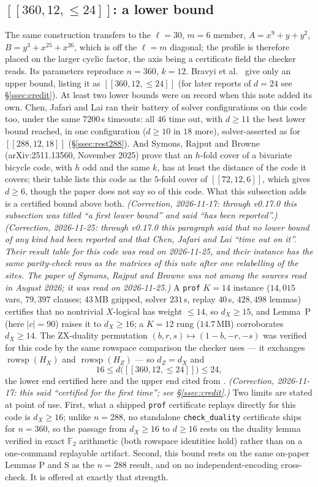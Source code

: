 \documentclass[11pt]{amsart}
\newcommand{\FF}{\mathbb{F}_{2}}
\newcommand{\rowsp}{\operatorname{rowsp}}
\newcommand{\HX}{H_{X}}
\newcommand{\HZ}{H_{Z}}
\newcommand{\dX}{d_{X}}
\newcommand{\dZ}{d_{Z}}
\theoremstyle{plain}
\theoremstyle{definition}
\theoremstyle{remark}
\begin{document}
\subsection{$[[360,12,\le24]]$: a lower bound}\label{ssec:bb360}
The same construction transfers to the $\ell=30$, $m=6$ member,
$A=x^{9}+y+y^{2}$, $B=y^{3}+x^{25}+x^{26}$, which is off the $\ell=m$ diagonal;
the profile is therefore placed on the larger cyclic factor, the axis being a
certificate field the checker reads. Its parameters reproduce $n=360$, $k=12$.
Bravyi et al.\ \cite{BCGMRY} give only an upper bound, listing it as
$[[360,12,\le24]]$ (for later reports of $d=24$ see \S\ref{ssec:credit}). At
least two lower bounds were on record when this note added its own. Chen,
Jafari and Lai \cite{ChenJafariLai} ran their battery of solver configurations
on this code too, under the same $7200$\,s timeouts: all $46$ time out, with
$d\ge11$ the best lower bound reached, in one configuration ($d\ge10$ in $18$
more), solver-asserted as for $[[288,12,18]]$ (\S\ref{ssec:rest288}). And
Symons, Rajput and Browne (arXiv:2511.13560, November 2025) prove that an
$h$-fold cover of a bivariate bicycle code, with $h$ odd and the same $k$, has
at least the distance of the code it covers; their table lists this code as
the $5$-fold cover of $[[72,12,6]]$, which gives $d\ge6$, though the paper does
not say so of this code. What this subsection adds is a certified bound above
both. \emph{(Correction, 2026-11-17: through
v0.17.0 this subsection was titled ``a first lower bound'' and said ``has been
reported''.)} \emph{(Correction, 2026-11-25: through v0.17.0 this paragraph
said that no lower bound of any kind had been reported and that Chen, Jafari
and Lai ``time out on it''. Their result table for this code was read on
2026-11-25, and their instance has the same parity-check rows as the matrices
of this note after one relabelling of the sites. The paper of Symons, Rajput
and Browne was not among the sources read in August 2026; it was read on
2026-11-25.)} A \texttt{prof} $K=14$ instance ($14{,}015$
vars, $79{,}397$ clauses; $43$\,MB gzipped, solver $231$\,s, replay $40$\,s,
$428{,}498$ lemmas) certifies that no nontrivial $X$-logical has weight $\le14$,
so $\dX\ge15$, and Lemma~P (here $|c|=90$) raises it to $\dX\ge16$; a $K=12$ rung
($14.7$\,MB) corroborates $\dX\ge14$. The ZX-duality permutation
$(b,r,s)\mapsto(1-b,-r,-s)$ was verified for this code by the same rowspace
comparison the checker uses --- it exchanges $\rowsp(\HX)$ and $\rowsp(\HZ)$ ---
so $\dZ=\dX$ and
\[
  16\le d\bigl([[360,12,\le24]]\bigr)\le24 ,
\]
the lower end certified here and the upper end cited from
\cite{BCGMRY}. \emph{(Correction, 2026-11-17: this said ``certified for the
first time''; see \S\ref{ssec:credit}.)} Two limits are stated at point of use. First, what a shipped
\texttt{prof} certificate replays directly for this code is $\dX\ge16$; unlike
$n=288$, no standalone \texttt{check\_duality} certificate ships for $n=360$, so
the passage from $\dX\ge16$ to $d\ge16$ rests on the duality lemma verified in
exact $\FF$ arithmetic (both rowspace identities hold) rather than on a
one-command replayable artifact. Second, this bound rests on the same on-paper
Lemmas P and S as the $n=288$ result, and on no independent-encoding
cross-check. It is offered at exactly that strength.
\end{document}
